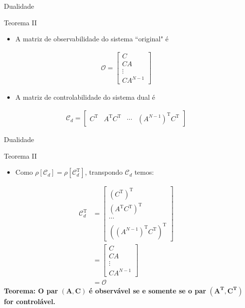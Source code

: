 \begin{frame}{Dualidade}
\begin{block}{Teorema II}
\begin{itemize}
    \item A matriz de observabilidade do sistema ``original" é
\end{itemize}
\begin{align*}
    \mathcal{O} = \begin{bmatrix} C \\ CA \\ \vdots \\ CA^{N-1} \end{bmatrix}
\end{align*}
\vspace{-0.3cm}
\begin{itemize}
    \item A matriz de controlabilidade do sistema dual é
\end{itemize}
\begin{align*}
    \mathcal{C}_d = \begin{bmatrix} C^\text{T} & A^\text{T}C^\text{T} & \cdots & (A^{N-1})^\text{T}C^\text{T} \end{bmatrix}
\end{align*}
\end{block}
\end{frame}

\begin{frame}{Dualidade}
\begin{block}{Teorema II}
\begin{itemize}
    \item Como $\rho[\mathcal{C}_d] = \rho[\mathcal{C}_d^\text{T}]$, transpondo $\mathcal{C}_d$ temos:
\end{itemize}
\begin{align*}
    \mathcal{C}_d^\text{T} &= \begin{bmatrix} (C^\text{T})^\text{T} \\ (A^\text{T}C^\text{T})^\text{T} \\ \cdots \\ ((A^{N-1})^\text{T}C^\text{T})^\text{T} \end{bmatrix} \\
    &= \begin{bmatrix} C \\ CA \\ \vdots \\ CA^{N-1} \end{bmatrix} \\
    &= \mathcal{O}
\end{align*}
\vspace{0.2cm}
\textbf{Teorema: O par} $\bm{(A,C)}$ \textbf{é observável se e somente se o par }$\bm{(A^\text{T}, C^\text{T})}$ \textbf{for controlável.}
\end{block}
\end{frame}

